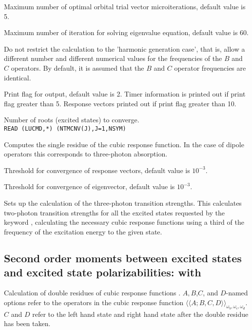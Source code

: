 \begin{description}
\item{}
Maximum number of optimal orbital trial vector microiterations,
default value is 5.

\item{}
Maximum number of iteration for solving eigenvalue equation, default
value is 60.

\item{} Do not restrict the calculation to the 'harmonic
  generation case', that is, allow a different number and different
  numerical values for the frequencies of the $B$ and $C$
  operators. By default, it is assumed that the $B$ and $C$ operator
  frequencies are identical.

\item{}
Print flag for output, default value is 2. Timer information is printed
out if print flag greater than 5. Response vectors printed out if
print flag greater than 10.

\item{}
Number of roots (excited states) to converge. \\
\verb|READ (LUCMD,*) (NTMCNV(J),J=1,NSYM)|\\

\item{}
Computes the single residue of the cubic
response function.
In the case of dipole operators this corresponds to
three-photon absorption.

\item{}
Threshold for convergence of response vectors, default value is $10^{-3}$.

\item{}
Threshold for convergence of eigenvector, default value is $10^{-3}$.

\item{}
Sets up the calculation of the three-photon transition strengths. This
calculates two-photon transition strengths for all the excited states
requested by the keyword , calculating the necessary
cubic response functions using  a third of the frequency of the
excitation energy to the given state.

\end{description}


\subsection{Second order moments between excited states and excited state polarizabilities:
 with }
Calculation of double residues of
cubic response functions
\cite{pndjovhacpl242,djpnhajcp105,pndjhapdkrthhkcpl253}.
$A,B$,$C$, and $D$-named options refer to the operators in the cubic
response function
$\langle\!\langle A;B,C,D \rangle\!\rangle_{\omega_b,\omega_c,\omega_d}$.
$C$ and $D$ refer to the left hand state and right hand state
after the double residue has been taken.

